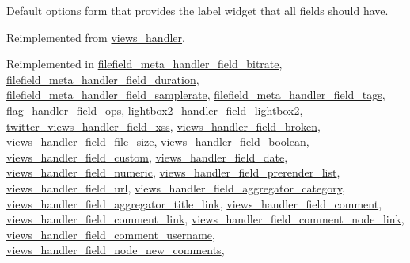 Default options form that provides the label widget that all fields should have. 

Reimplemented from \hyperlink{classviews__handler_a41fcf16b177eb03e35facbae6320f74}{views\_\-handler}.

Reimplemented in \hyperlink{classfilefield__meta__handler__field__bitrate_74c60e6bbcee2bbaed721a9ed7eea05c}{filefield\_\-meta\_\-handler\_\-field\_\-bitrate}, \hyperlink{classfilefield__meta__handler__field__duration_4c26d6d5b7dad8dce469f82d9bc9c70c}{filefield\_\-meta\_\-handler\_\-field\_\-duration}, \hyperlink{classfilefield__meta__handler__field__samplerate_7ca6744f5ce24aea26f093027538d5ac}{filefield\_\-meta\_\-handler\_\-field\_\-samplerate}, \hyperlink{classfilefield__meta__handler__field__tags_b95bd58dd3d2486b63c2498410cc65be}{filefield\_\-meta\_\-handler\_\-field\_\-tags}, \hyperlink{classflag__handler__field__ops_88b37806cdb2d420b830d0030ef7028a}{flag\_\-handler\_\-field\_\-ops}, \hyperlink{classlightbox2__handler__field__lightbox2_6e0462dcba8bb237b822be3d844ed24b}{lightbox2\_\-handler\_\-field\_\-lightbox2}, \hyperlink{classtwitter__views__handler__field__xss_4896b110fa64c3beed9fb17b5f01b437}{twitter\_\-views\_\-handler\_\-field\_\-xss}, \hyperlink{classviews__handler__field__broken_fc66860f4fb5a1878a131c30500e6e1d}{views\_\-handler\_\-field\_\-broken}, \hyperlink{classviews__handler__field__file__size_b701c7b97e6688971ddfdcd7e9539262}{views\_\-handler\_\-field\_\-file\_\-size}, \hyperlink{classviews__handler__field__boolean_3addce6b85348a630627f348907082e3}{views\_\-handler\_\-field\_\-boolean}, \hyperlink{classviews__handler__field__custom_886688de7d2ac5bc4ef3b588a2e5056a}{views\_\-handler\_\-field\_\-custom}, \hyperlink{classviews__handler__field__date_cc152b1ff3dd0a65bc4d372c97c7c8e0}{views\_\-handler\_\-field\_\-date}, \hyperlink{classviews__handler__field__numeric_e6f81d1896ece64e9450ebc2d60da2fd}{views\_\-handler\_\-field\_\-numeric}, \hyperlink{classviews__handler__field__prerender__list_6a88df29dbdd11aefc5d108dca6530e0}{views\_\-handler\_\-field\_\-prerender\_\-list}, \hyperlink{classviews__handler__field__url_47ffe90c19fe1a114df84f5779567cd3}{views\_\-handler\_\-field\_\-url}, \hyperlink{classviews__handler__field__aggregator__category_43be8cbc1313b8b3f51321490d40a914}{views\_\-handler\_\-field\_\-aggregator\_\-category}, \hyperlink{classviews__handler__field__aggregator__title__link_6ebe6b2dc8c306fc32258be795f21f3b}{views\_\-handler\_\-field\_\-aggregator\_\-title\_\-link}, \hyperlink{classviews__handler__field__comment_5afe1cb8daaae349f0f39b9ce0195753}{views\_\-handler\_\-field\_\-comment}, \hyperlink{classviews__handler__field__comment__link_82957426a30584198c79c78804265bdc}{views\_\-handler\_\-field\_\-comment\_\-link}, \hyperlink{classviews__handler__field__comment__node__link_4a4be3287da8267b5571d1fe404f9070}{views\_\-handler\_\-field\_\-comment\_\-node\_\-link}, \hyperlink{classviews__handler__field__comment__username_9bcc4bbe9ebbd7247431cfc18c5bab9c}{views\_\-handler\_\-field\_\-comment\_\-username}, \hyperlink{classviews__handler__field__node__new__comments_2a209d3acbaa47e781df96bc0ca85156}{views\_\-handler\_\-field\_\-node\_\-new\_\-comments}, 